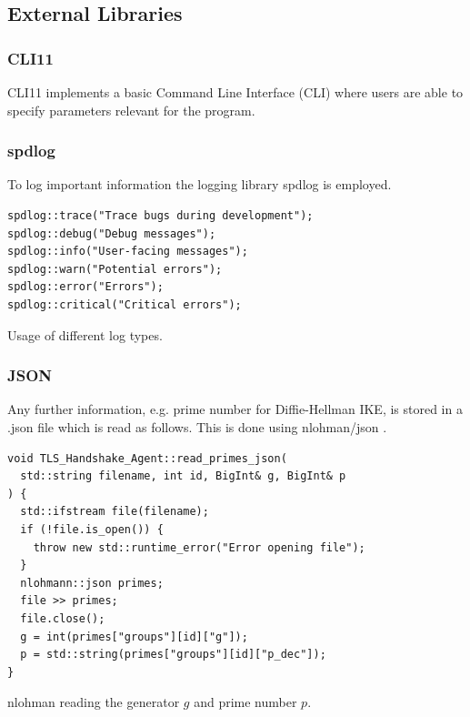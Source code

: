 \documentclass[12pt, letterpaper]{article}
\newenvironment{code}{\captionsetup{type=listing}}{}
\begin{document}
\pagebreak

\subsection{External Libraries}
\label{extBib}

\subsubsection{CLI11}
CLI11 \cite{cli11_ref} implements a basic Command Line Interface (CLI) where users are able to specify parameters relevant for the program. 


\subsubsection{spdlog}
To log important information the logging library spdlog \cite{spdlog_ref} is employed.

\begin{code}
	\begin{verbatim}
spdlog::trace("Trace bugs during development");
spdlog::debug("Debug messages");
spdlog::info("User-facing messages");
spdlog::warn("Potential errors");
spdlog::error("Errors");
spdlog::critical("Critical errors");
	\end{verbatim}
	\caption{Usage of different log types.}
	\label{spdlog}
\end{code}


\subsubsection{JSON}
Any further information, e.g. prime number for Diffie-Hellman IKE, is stored in a .json file which is read as follows. This is done using nlohman/json \cite{json_ref}.

\begin{code}
	\begin{verbatim}
void TLS_Handshake_Agent::read_primes_json(
  std::string filename, int id, BigInt& g, BigInt& p
) {
  std::ifstream file(filename);
  if (!file.is_open()) {
    throw new std::runtime_error("Error opening file");
  }
  nlohmann::json primes;
  file >> primes;
  file.close();
  g = int(primes["groups"][id]["g"]); 
  p = std::string(primes["groups"][id]["p_dec"]);
}
	\end{verbatim}
	\caption{nlohman reading the generator $g$ and prime number $p$.}
	\label{json}
\end{code}
\end{document}
